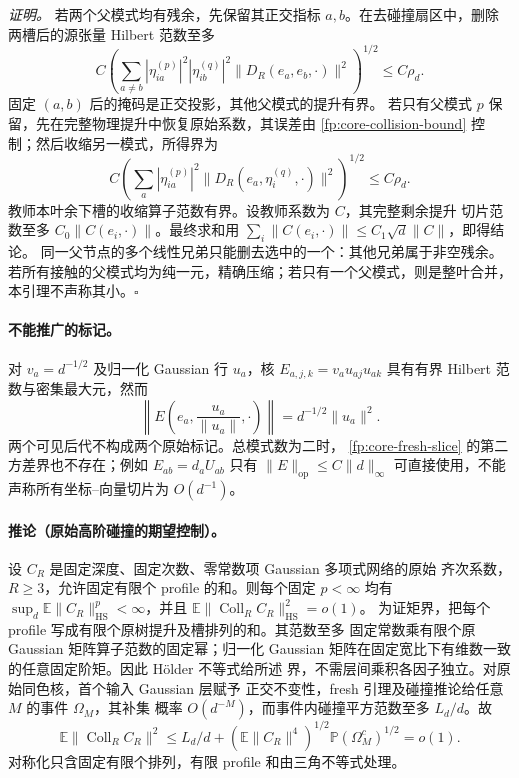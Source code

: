 \documentclass[a4paper]{tufte-handout}
\begin{document}
\begin{fullwidth}
\emph{证明。}
若两个父模式均有残余，先保留其正交指标 $a,b$。在去碰撞扇区中，删除
两槽后的源张量 Hilbert 范数至多
\[
 C\left(\sum_{a\ne b}|\eta^{(p)}_{ia}|^2|\eta^{(q)}_{ib}|^2
                 \|D_R(e_a,e_b,\cdot)\|^2\right)^{1/2}
 \leq C\rho_d.
\]
固定 $(a,b)$ 后的掩码是正交投影，其他父模式的提升有界。
若只有父模式 $p$ 保留，先在完整物理提升中恢复原始系数，其误差由
\eqref{fp:core-collision-bound} 控制；然后收缩另一模式，所得界为
\[
 C\left(\sum_a|\eta^{(p)}_{ia}|^2
       \|D_R(e_a,\eta_i^{(q)},\cdot)\|^2\right)^{1/2}
 \leq C\rho_d.
\]
教师本叶余下槽的收缩算子范数有界。设教师系数为 $C$，其完整剩余提升
切片范数至多 $C_0\|C(e_i,\cdot)\|$。最终求和用
$\sum_i\|C(e_i,\cdot)\|\leq C_1\sqrt d\|C\|$，即得结论。
同一父节点的多个线性兄弟只能删去选中的一个：其他兄弟属于非空残余。
若所有接触的父模式均为纯一元，精确压缩；若只有一个父模式，则是整叶合并，
本引理不声称其小。\hfill$\square$

\paragraph{不能推广的标记。}
对 $v_a=d^{-1/2}$ 及归一化 Gaussian 行 $u_a$，核
$E_{a,j,k}=v_au_{aj}u_{ak}$ 具有有界 Hilbert 范数与密集最大元，然而
\[
 \left\|E\left(e_a,\frac{u_a}{\|u_a\|},\cdot\right)\right\|
 =d^{-1/2}\|u_a\|^2.
\]
两个可见后代不构成两个原始标记。总模式数为二时，
\eqref{fp:core-fresh-slice} 的第二方差界也不存在；例如
$E_{ab}=d_aU_{ab}$ 只有 $\|E\|_{\mathrm{op}}\leq C\|d\|_\infty$
可直接使用，不能声称所有坐标--向量切片为 $O(d^{-1})$。

\paragraph{推论（原始高阶碰撞的期望控制）。}
\label{fp:core-raw-collision-expectation}
设 $C_R$ 是固定深度、固定次数、零常数项 Gaussian 多项式网络的原始
齐次系数，$R\geq3$，允许固定有限个 profile 的和。则每个固定 $p<\infty$
均有 $\sup_d\mathbb E\|C_R\|_{\mathrm{HS}}^p<\infty$，并且
$\mathbb E\|\operatorname{Coll}_R C_R\|_{\mathrm{HS}}^2=o(1)$。
为证矩界，把每个 profile 写成有限个原树提升及槽排列的和。其范数至多
固定常数乘有限个原 Gaussian 矩阵算子范数的固定幂；归一化 Gaussian
矩阵在固定宽比下有维数一致的任意固定阶矩。因此 H\"older 不等式给所述
界，不需层间乘积各因子独立。对原始同色核，首个输入 Gaussian 层赋予
正交不变性，fresh 引理及碰撞推论给任意 $M$ 的事件 $\Omega_M$，其补集
概率 $O(d^{-M})$，而事件内碰撞平方范数至多 $L_d/d$。故
\[
 \mathbb E\|\operatorname{Coll}_R C_R\|^2
 \leq L_d/d+
 (\mathbb E\|C_R\|^4)^{1/2}\mathbb P(\Omega_M^c)^{1/2}=o(1).
\]
对称化只含固定有限个排列，有限 profile 和由三角不等式处理。


\end{fullwidth}
\end{document}
